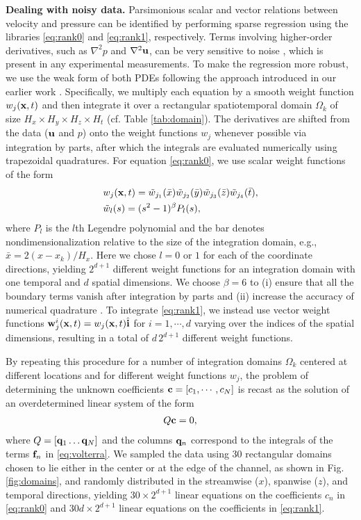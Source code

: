 \documentclass[
 reprint,
 amsmath,amssymb,
 aps,
]{revtex4-2}
\begin{document}
{\bf Dealing with noisy data.} Parsimonious scalar and vector relations between velocity and pressure can be identified by performing sparse regression using the libraries \eqref{eq:rank0} and \eqref{eq:rank1}, respectively. 
Terms involving higher-order derivatives, such as $\nabla^2p$ and $\nabla^2{\bf u}$, can be very sensitive to noise \cite{rudy2017,reinbold2019}, which is present in any experimental measurements. 
To make the regression more robust, we use the weak form of both PDEs following the approach introduced in our earlier work \cite{gurevich2019}. 
Specifically, we multiply each equation by a smooth weight function $w_j({\bf x},t)$ and then integrate it over a rectangular spatiotemporal domain $\Omega_k$ of size $H_x\times H_y\times H_z\times H_t$  (cf. Table \ref{tab:domain}). 
The derivatives are shifted from the data (${\bf u}$ and $p$) onto the weight functions $w_j$ whenever possible via integration by parts, after which the integrals are evaluated numerically using trapezoidal quadratures. 
For equation \eqref{eq:rank0}, we use scalar weight functions of the form
\begin{align} \label{eq:wf}
&w_j({\bf x},t) = \tilde{w}_{j_1}(\bar{x})\tilde{w}_{j_2}(\bar{y})\tilde{w}_{j_3}(\bar{z})\tilde{w}_{j_4}(\bar{t}), \nonumber\\
&\tilde{w}_l(s) = (s^2-1)^\beta P_l(s),
\end{align}
where $P_l$ is the $l$th Legendre polynomial and the bar denotes nondimensionalization relative to the size of the integration domain, e.g., $\bar{x}=2(x-x_k)/H_x$. Here we chose $l=0$ or $1$ for each of the coordinate directions, yielding $2^{d+1}$ different weight functions for 
an integration domain with one temporal and $d$ spatial dimensions.
We choose $\beta = 6$ to (i) ensure that all the boundary terms vanish after integration by parts and (ii) increase the accuracy of numerical quadrature \cite{gurevich2019}. To integrate \eqref{eq:rank1}, we instead use vector weight functions ${\bf w}^i_j({\bf x},t) = w_j({\bf x},t)\hat{\bf i}$ for $i=1,\cdots,d$ varying over the indices of the spatial dimensions, resulting in a total of $d\,2^{d+1}$ different weight functions. 

By repeating this procedure for a number of integration domains $\Omega_k$ centered at different locations and for different weight functions $w_j$, the problem of determining the unknown coefficients ${\bf c}=[c_1,\cdots,c_N]$ is recast as the solution of an overdetermined linear system of the form
\begin{align}
    Q{\bf c} = 0,
    \label{eq:lin}
\end{align}
where $Q = [{\bf q}_1 \dots {\bf q}_N]$ and the columns ${\bf q}_n$ correspond to the integrals of the terms ${\bf f}_n$ in \eqref{eq:volterra}. We sampled the data using 30 rectangular domains chosen to lie either in the center or at the edge of the channel, as shown in Fig. \ref{fig:domains}, and randomly distributed in the streamwise ($x$), spanwise ($z$), and temporal directions, yielding $30\times 2^{d+1}$ linear equations on the coefficients $c_n$ in \eqref{eq:rank0} and $30d\times 2^{d+1}$ linear equations on the coefficients in \eqref{eq:rank1}.
\end{document}
